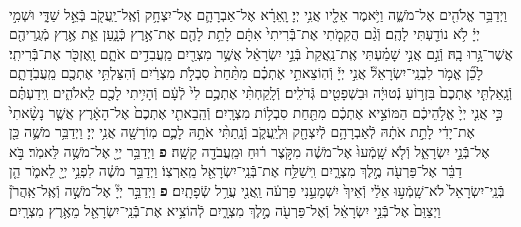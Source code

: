 \documentclass[twoside, openany, parskip=half, 11pt]{book}
\begin{document}
\begin{footnotesize}
\begin{multicols}{2}
\\
וַיְדַבֵּ֥ר אֱלֹהִ֖ים אֶל־מֹשֶׁ֑ה וַיֹּ֥אמֶר אֵלָ֖יו אֲנִ֥י יְיָ׃ וָֽאֵרָ֗א אֶל־אַבְרָהָ֛ם אֶל־יִצְחָ֥ק וְֿאֶֽל־יַֽעֲקֹ֖ב בְּֿאֵ֣ל שַׁדָּ֑י וּשְׁמִ֣י יְיָ֔ לֹ֥א נוֹדַ֖עְתִּי לָהֶֽם׃ וְֿגַ֨ם הֲקִמֹ֤תִי אֶת־בְּֿֿרִיתִי֙ אִתָּ֔ם לָתֵ֥ת לָהֶ֖ם אֶת־אֶ֣רֶץ כְּֿנָ֑עַן אֵ֛ת אֶ֥רֶץ מְֿגֻֽרֵיהֶ֖ם אֲשֶׁר־גָּ֥רוּ בָֽהּ׃ וְֿגַ֣ם אֲנִ֣י שָׁמַ֗עְתִּי אֶֽת־נַֽאֲקַת֙ בְּֿנֵ֣י יִשְׂרָאֵ֔ל אֲשֶׁ֥ר מִצְרַ֖יִם מַֽעֲבִדִ֣ים אֹתָ֑ם וָֽאֶזְכֹּ֖ר אֶת־בְּֿֿרִיתִֽי׃  לָכֵ֞ן אֱמֹ֥ר לִבְנֵֽי־יִשְׂרָאֵל֘ אֲנִ֣י יְיָ֒ וְֿהֽוֹצֵאתִ֣י אֶתְכֶ֗ם מִתַּ֨חַת֙ סִבְלֹ֣ת מִצְרַ֔יִם וְֿהִצַּלְתִּ֥י אֶתְכֶ֖ם מֵֽעֲבֹֽדָתָ֑ם וְֿגָֽאַלְתִּ֤י אֶתְכֶם֙ בִּזְר֣וֹעַ נְֿטוּיָ֔ה וּבִשְׁפָטִ֖ים גְּֿדֹלִֽים׃ וְֿלָֽקַחְתִּ֨י אֶתְכֶ֥ם לִי֙ לְֿעָ֔ם וְֿהָיִ֥יתִי לָכֶ֖ם לֵֽאלֹהִ֑ים וִֽידַעְתֶּ֗ם כִּ֣י אֲנִ֤י יְיָ֙ אֱלֹ֣הֵיכֶ֔ם הַמּוֹצִ֣יא אֶתְכֶ֔ם מִתַּ֖חַת סִבְל֥וֹת מִצְרָֽיִם׃ וְֿהֵֽבֵאתִ֤י אֶתְכֶם֙ אֶל־הָאָ֔רֶץ אֲשֶׁ֤ר נָשָׂ֨אתִי֙ אֶת־יָדִ֔י לָתֵ֣ת אֹתָ֔הּ לְֿאַבְרָהָ֥ם לְֿיִצְחָ֖ק וּֽלְיַֽעֲקֹ֑ב וְֿנָֽתַתִּ֨י אֹתָ֥הּ לָכֶ֛ם מֽוֹרָשָׁ֖ה אֲנִ֥י יְיָ׃ וַיְדַבֵּ֥ר מֹשֶׁ֛ה כֵּ֖ן אֶל־בְּֿֿנֵ֣י יִשְׂרָאֵ֑ל וְֿלֹ֤א שָֽׁמְֿעוּ֙ אֶל־מֹשֶׁ֔ה מִקֹּ֣צֶר ר֔וּחַ וּמֵֽעֲבֹדָ֖ה קָשָֽׁה׃ \textbf{פ}
וַיְדַבֵּ֥ר יְיָ֖ אֶל־מֹשֶׁ֥ה לֵּאמֹֽר׃ בֹּ֣א דַבֵּ֔ר אֶל־פַּרְעֹ֖ה מֶ֣לֶךְ מִצְרָ֑יִם וִֽישַׁלַּ֥ח אֶת־בְּֿֿנֵֽי־יִשְׂרָאֵ֖ל מֵֽאַרְצֽוֹ׃ וַיְדַבֵּ֣ר מֹשֶׁ֔ה לִפְנֵ֥י יְיָ֖ לֵאמֹ֑ר הֵ֤ן בְּֿנֵֽי־יִשְׂרָאֵל֙ לֹא־שָֽׁמְֿע֣וּ אֵלַ֔י וְֿאֵיךְ֙ יִשְׁמָעֵ֣נִי פַרְעֹ֔ה וַֽאֲנִ֖י עֲרַ֥ל שְֿׂפָתָֽיִם׃ \textbf{פ}
וַיְדַבֵּ֣ר יְיָ֘ אֶל־מֹשֶׁ֣ה וְֿאֶֽל־אַֽהֲרֹן֒ וַיְצַוֵּם֙ אֶל־בְּֿֿנֵ֣י יִשְׂרָאֵ֔ל וְֿאֶל־פַּרְעֹ֖ה מֶ֣לֶךְ מִצְרָ֑יִם לְֿהוֹצִ֥יא אֶת־בְּֿֿנֵֽי־יִשְׂרָאֵ֖ל מֵאֶ֥רֶץ מִצְרָֽיִם׃


\end{multicols}
\end{footnotesize}
\end{document}
